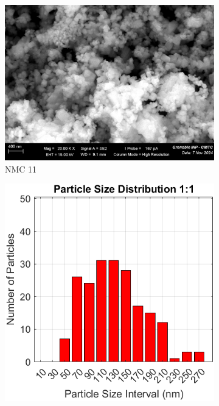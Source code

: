 \documentclass{article}
\begin{document}
{\begin{itemize}
\begin{figure}[H]
    \centering
    \begin{subfigure}[t]{0.45\textwidth}
        \centering
        \includegraphics[width=\textwidth]{NMC_11_legend.png}
        \caption{NMC 11 }
    \end{subfigure}
    \hfill
    \begin{subfigure}[t]{0.45\textwidth}
        \centering
        \includegraphics[width=\textwidth]{NMC11SEMDIST.png}
        \caption{}
    \end{subfigure}


\end{figure}
\end{itemize}}
\end{document}

